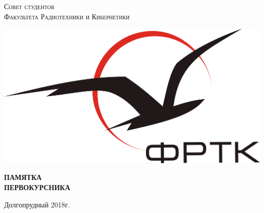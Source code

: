 \documentclass[14pt]{extarticle}
\newenvironment{bottompar}{\par\vspace*{\fill}}{\clearpage}
\begin{document}
\begin{titlepage}

\center %


\textsc{\Large Совет студентов}\\ %
\textsc{\Large Факультета Радиотехники и Кибернетики}\\[3cm] %


\begin{center}
    \includegraphics[width = 130 mm]{resources/logo.png}
    \\[2cm]
\end{center}



    { \huge \bfseries ПАМЯТКА }\\[0.5cm]
    { \huge \bfseries ПЕРВОКУРСНИКА}

\begin{bottompar}
    {\Large Долгопрудный 2018г.}
\end{bottompar}
\vfill %

\end{titlepage}

\tableofcontents
\end{document}
